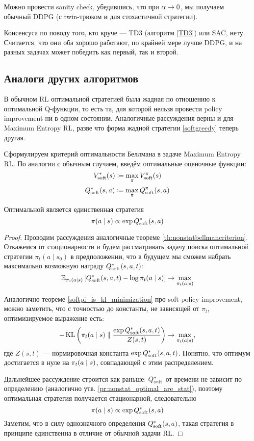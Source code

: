 Можно провести sanity check, убедившись, что при $\alpha \HM\to 0$, мы получаем обычный DDPG (с twin-трюком и для стохастичной стратегии).

\begin{remark}
Консенсуса по поводу того, кто круче --- TD3 (алгоритм \ref{TD3}) или SAC, нету. Считается, что они оба хорошо работают, по крайней мере лучше DDPG, и на разных задачах может победить как первый, так и второй.
\end{remark}

\subsection{Аналоги других алгоритмов}

В обычном RL оптимальной стратегией была жадная по отношению к оптимальной Q-функции, то есть та, для которой нельзя провести policy improvement ни в одном состоянии. Аналогичные рассуждения верны и для Maximum Entropy RL, разве что форма жадной стратегии \eqref{softgreedy} теперь другая.

Сформулируем критерий оптимальности Беллмана в задаче Maximum Entropy RL. По аналогии с обычным случаем, введём оптимальные оценочные функции:
$$V^*_{\mathrm{soft}}(s) \coloneqq \max_{\pi} V^{\pi}_{\mathrm{soft}}(s)$$
$$Q^*_{\mathrm{soft}}(s, a) \coloneqq \max_{\pi} Q^{\pi}_{\mathrm{soft}}(s, a)$$

\begin{theorem}
Оптимальной является единственная стратегия
$$\pi(a \mid s) \propto \exp{Q^*_{\mathrm{soft}}(s, a)}$$
\begin{proof} Проводим рассуждения аналогичные теореме \ref{th:nonstatbellmancriterion}. Откажемся от стационарности и будем рассматривать задачу поиска оптимальной стратегии $\pi_t(a \mid s_0)$ в предположении, что в будущем мы сможем набрать максимально возможную награду $Q^*_{\mathrm{soft}}(s, a, t)$:
$$\mathbb{E}_{\pi_t(a \mid s)} \left[ Q^*_{\mathrm{soft}}(s, a, t) - \log \pi_t(a \mid s) \right] \to \max\limits_{\pi_t(a \mid s)}
$$

Аналогично теореме \ref{softpi_is_kl_minimization} про soft policy improvement, можно заметить, что с точностью до константы, не зависящей от $\pi_t$, оптимизируемое выражение есть:
$$-\KL \left( \pi_t(a \mid s) \parallel \frac{\exp Q^*_{\soft}(s, a, t)}{Z(s, t)} \right) \to \max\limits_{\pi_t(a \HM\mid s)},$$
где $Z(s, t)$ --- нормировочная константа $\exp Q^*_{\mathrm{soft}}(s, a, t)$. Понятно, что оптимум достигается в нуле на $\pi_t(a \HM\mid s)$, совпадающей с этим распределением.

Дальнейшее рассуждение строится как раньше: $Q^*_{\mathrm{soft}}$ от времени не зависит по определению (аналогично утв. \ref{pr:nonstat_optimal_are_stat}), поэтому оптимальная стратегия получается стационарной, следовательно
\begin{equation*}
\pi(a \mid s) \propto \exp Q^*_{\mathrm{soft}}(s, a)
\end{equation*}
Заметим, что в силу однозначного определения $Q^*_{\mathrm{soft}}(s, a)$, такая стратегия в принципе единственна в отличие от обычной задачи RL.
\end{proof}
\end{theorem}

